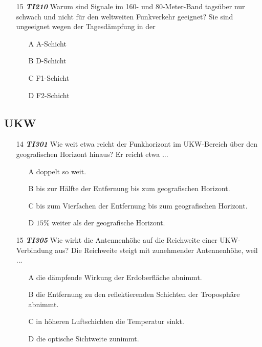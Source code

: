 \begin{enumerate} 
\itemsep1pt\parskip0pt
\item[15] \emph{\textbf{TI210}}   Warum sind Signale im 160- und 80-Meter-Band tagsüber nur schwach und nicht für den weltweiten Funkverkehr geeignet? Sie sind ungeeignet wegen der Tagesdämpfung in der
	\begin{enumerate}
	\itemsep1pt\parskip0pt
		\item[A] A-Schicht
		\item[B] D-Schicht
		\item[C] F1-Schicht
		\item[D] F2-Schicht
	\end{enumerate}
\end{enumerate}

\subsection*{UKW}

\begin{enumerate} 
\itemsep1pt\parskip0pt
\item[14] \emph{\textbf{TI301}}   Wie weit etwa reicht der Funkhorizont im UKW-Bereich über den geografischen Horizont hinaus? Er reicht etwa ...
	\begin{enumerate}
	\itemsep1pt\parskip0pt
		\item[A] doppelt so weit.
		\item[B] bis zur Hälfte der Entfernung bis zum geografischen Horizont.
		\item[C] bis zum Vierfachen der Entfernung bis zum geografischen Horizont.
		\item[D] $15 \%$ weiter als der geografische Horizont.
	\end{enumerate}
\end{enumerate}

\begin{enumerate} 
\itemsep1pt\parskip0pt
\item[15] \emph{\textbf{TI305}}   Wie wirkt die Antennenhöhe auf die Reichweite einer UKW-Verbindung aus? Die Reichweite steigt mit zunehmender Antennenhöhe, weil ...
	\begin{enumerate}
	\itemsep1pt\parskip0pt
		\item[A] die dämpfende Wirkung der Erdoberfläche abnimmt.
		\item[B] die Entfernung zu den reflektierenden Schichten der Troposphäre abnimmt.
		\item[C] in höheren Luftschichten die Temperatur sinkt.
		\item[D] die optische Sichtweite zunimmt.
	\end{enumerate}
\end{enumerate}

